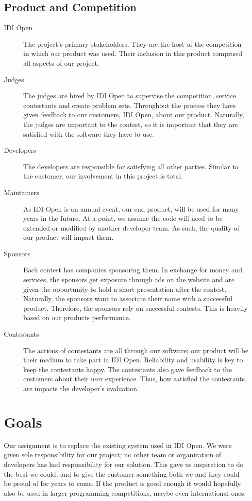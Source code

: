 \subsection{Product and Competition}
\begin{description}
\item[IDI Open]
The project's primary stakeholders. They are the host of
the competition in which our product was used. Their inclusion in this
product comprised all aspects of our project.

\item[Judges]
The judges are hired by IDI Open to supervise the competition, service
contestants and create problem sets. Throughout the process they have given
feedback to our customers, IDI Open, about our product. Naturally, the
judges are important to the contest, so it is important that they are
satisfied with the software they have to use.

\item[Developers]
The developers are responsible for satisfying all other parties. Similar
to the customer, our involvement in this project is total.

\item[Maintainers]
As IDI Open is an annual event, our end product, will be used for many 
years in the future. At a point, we assume the code will need to be 
extended or modified by another developer team. 
As such, the quality of our product will impact them.

\item[Sponsors]
Each contest has companies sponsoring them. In exchange for money and
services, the sponsors get exposure through ads on the website and are
given the opportunity to hold a short presentation after the contest. Naturally, the
sponsors want to associate their name with a successful product.
Therefore, the sponsors rely on successful contests. This is
heavily based on our products performance.

\item[Contestants]
The actions of contestants are all through our software; our product will be
their medium to take part in IDI Open. Reliability and usability is key to keep
the contestants happy. The contestants also gave feedback to the customers
about their user experience. Thus, how satisfied the contestants are impacts
the developer's evaluation.
\end{description}

\section{Goals}
Our assignment is to replace the existing system used in IDI Open. We were
given sole responsibility for our project; no other team or organization of
developers has had responsibility for our solution. This gave us inspiration to
do the best we could, and to give the customer something both we and they could
be proud of for years to come.  If the product is good enough it would
hopefully also be used in larger programming competitions, maybe even
international ones.
